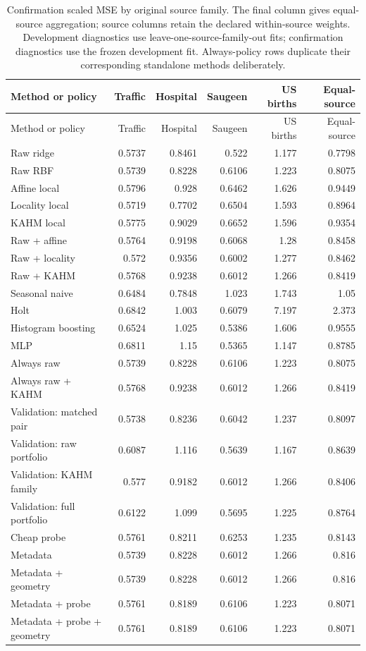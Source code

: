 {\small\setlength{\tabcolsep}{4pt}
\begin{longtable}{lrrrrr}
\caption{Confirmation scaled MSE by original source family. The final column gives equal-source aggregation; source columns retain the declared within-source weights. Development diagnostics use leave-one-source-family-out fits; confirmation diagnostics use the frozen development fit. Always-policy rows duplicate their corresponding standalone methods deliberately.}\label{tab:source-confirmation-loss}\\
\toprule
Method or policy & Traffic & Hospital & Saugeen & US births & Equal-source \\
\midrule
\endfirsthead
\toprule
Method or policy & Traffic & Hospital & Saugeen & US births & Equal-source \\
\midrule
\endhead
Raw ridge & 0.5737 & 0.8461 & 0.522 & 1.177 & 0.7798 \\
Raw RBF & 0.5739 & 0.8228 & 0.6106 & 1.223 & 0.8075 \\
Affine local & 0.5796 & 0.928 & 0.6462 & 1.626 & 0.9449 \\
Locality local & 0.5719 & 0.7702 & 0.6504 & 1.593 & 0.8964 \\
KAHM local & 0.5775 & 0.9029 & 0.6652 & 1.596 & 0.9354 \\
Raw + affine & 0.5764 & 0.9198 & 0.6068 & 1.28 & 0.8458 \\
Raw + locality & 0.572 & 0.9356 & 0.6002 & 1.277 & 0.8462 \\
Raw + KAHM & 0.5768 & 0.9238 & 0.6012 & 1.266 & 0.8419 \\
Seasonal naive & 0.6484 & 0.7848 & 1.023 & 1.743 & 1.05 \\
Holt & 0.6842 & 1.003 & 0.6079 & 7.197 & 2.373 \\
Histogram boosting & 0.6524 & 1.025 & 0.5386 & 1.606 & 0.9555 \\
MLP & 0.6811 & 1.15 & 0.5365 & 1.147 & 0.8785 \\
Always raw & 0.5739 & 0.8228 & 0.6106 & 1.223 & 0.8075 \\
Always raw + KAHM & 0.5768 & 0.9238 & 0.6012 & 1.266 & 0.8419 \\
Validation: matched pair & 0.5738 & 0.8236 & 0.6042 & 1.237 & 0.8097 \\
Validation: raw portfolio & 0.6087 & 1.116 & 0.5639 & 1.167 & 0.8639 \\
Validation: KAHM family & 0.577 & 0.9182 & 0.6012 & 1.266 & 0.8406 \\
Validation: full portfolio & 0.6122 & 1.099 & 0.5695 & 1.225 & 0.8764 \\
Cheap probe & 0.5761 & 0.8211 & 0.6253 & 1.235 & 0.8143 \\
Metadata & 0.5739 & 0.8228 & 0.6012 & 1.266 & 0.816 \\
Metadata + geometry & 0.5739 & 0.8228 & 0.6012 & 1.266 & 0.816 \\
Metadata + probe & 0.5761 & 0.8189 & 0.6106 & 1.223 & 0.8071 \\
Metadata + probe + geometry & 0.5761 & 0.8189 & 0.6106 & 1.223 & 0.8071 \\
\bottomrule
\end{longtable}
}

